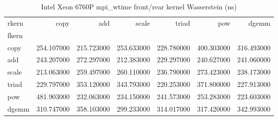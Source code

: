 \begin{table}
\caption{Intel Xeon 6760P mpi_wtime front/rear kernel Wasserstein (ns)}
\begin{tabular}{lrrrrrr}
\toprule
rkern & copy & add & scale & triad & pow & dgemm \\
fkern &  &  &  &  &  &  \\
\midrule
copy & 254.107000 & 215.723000 & 253.633000 & 228.780000 & 400.303000 & 316.493000 \\
add & 243.207000 & 272.297000 & 212.383000 & 229.297000 & 240.627000 & 241.060000 \\
scale & 213.063000 & 259.497000 & 260.110000 & 236.790000 & 273.423000 & 238.173000 \\
triad & 229.797000 & 353.120000 & 343.793000 & 220.253000 & 371.800000 & 227.913000 \\
pow & 481.903000 & 232.063000 & 234.150000 & 241.573000 & 253.283000 & 223.603000 \\
dgemm & 310.747000 & 358.103000 & 299.233000 & 314.017000 & 317.420000 & 342.993000 \\
\bottomrule
\end{tabular}
\end{table}
